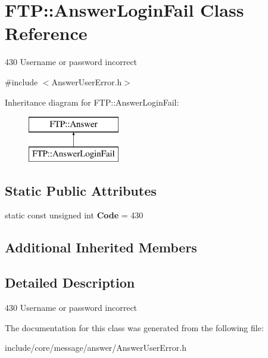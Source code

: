 \hypertarget{class_f_t_p_1_1_answer_login_fail}{\section{F\-T\-P\-:\-:Answer\-Login\-Fail Class Reference}
\label{class_f_t_p_1_1_answer_login_fail}
}


430 Username or password incorrect  




{\ttfamily \#include $<$Answer\-User\-Error.\-h$>$}

Inheritance diagram for F\-T\-P\-:\-:Answer\-Login\-Fail\-:\begin{figure}[H]
\begin{center}
\leavevmode
\includegraphics[height=2.000000cm]{class_f_t_p_1_1_answer_login_fail}
\end{center}
\end{figure}
\subsection*{Static Public Attributes}
\begin{DoxyCompactItemize}
\item 
\hypertarget{class_f_t_p_1_1_answer_login_fail_add2a45cb80065adb45244ffd47b10ce5}{static const unsigned int {\bfseries Code} = 430}\label{class_f_t_p_1_1_answer_login_fail_add2a45cb80065adb45244ffd47b10ce5}

\end{DoxyCompactItemize}
\subsection*{Additional Inherited Members}


\subsection{Detailed Description}
430 Username or password incorrect 

The documentation for this class was generated from the following file\-:\begin{DoxyCompactItemize}
\item 
include/core/message/answer/Answer\-User\-Error.\-h\end{DoxyCompactItemize}
